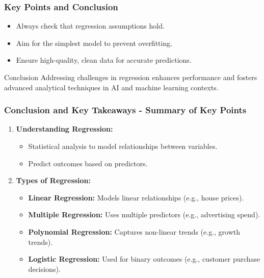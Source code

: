\documentclass[aspectratio=169]{beamer}
\begin{document}
\begin{frame}[fragile]
    \frametitle{Key Points and Conclusion}
    \begin{itemize}
        \item Always check that regression assumptions hold.
        \item Aim for the simplest model to prevent overfitting.
        \item Ensure high-quality, clean data for accurate predictions.
    \end{itemize}
    \begin{block}{Conclusion}
        Addressing challenges in regression enhances performance and fosters advanced analytical techniques in AI and machine learning contexts.
    \end{block}
\end{frame}

\begin{frame}[fragile]
    \frametitle{Conclusion and Key Takeaways - Summary of Key Points}
    
    \begin{enumerate}
        \item \textbf{Understanding Regression:} 
        \begin{itemize}
            \item Statistical analysis to model relationships between variables.
            \item Predict outcomes based on predictors.
        \end{itemize}
        
        \item \textbf{Types of Regression:} 
        \begin{itemize}
            \item \textbf{Linear Regression:} Models linear relationships (e.g., house prices).
            \item \textbf{Multiple Regression:} Uses multiple predictors (e.g., advertising spend).
            \item \textbf{Polynomial Regression:} Captures non-linear trends (e.g., growth trends).
            \item \textbf{Logistic Regression:} Used for binary outcomes (e.g., customer purchase decisions).
        \end{itemize}
    \end{enumerate}
\end{frame}
\end{document}
